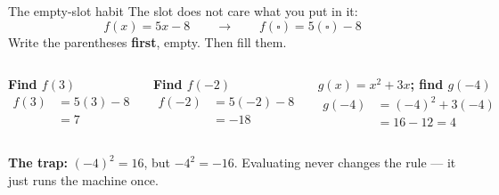 \documentclass[aspectratio=169, 11pt]{beamer}
\begin{document}
\begin{frame}[t, plain]

  \begin{block}{The empty-slot habit}
    The slot does not care what you put in it:
    \[ f(x) = 5x - 8 \qquad\longrightarrow\qquad f(\square) = 5(\square) - 8 \]
    Write the parentheses \textbf{first}, empty. Then fill them.
  \end{block}

  \bigskip
  \begin{columns}[T]
      \textbf{Find \(f(3)\)}
      \begin{align*}
        f(3) &= 5(3) - 8 \\
             &= 7
      \end{align*}

      \textbf{Find \(f(-2)\)}
      \begin{align*}
        f(-2) &= 5(-2) - 8 \\
              &= -18
      \end{align*}

      \textbf{\(g(x) = x^2 + 3x\); find \(g(-4)\)}
      \begin{align*}
        g(-4) &= (-4)^2 + 3(-4) \\
              &= 16 - 12 = 4
      \end{align*}
  \end{columns}

  \bigskip
  \textbf{The trap:} \((-4)^2 = 16\), but \(-4^2 = -16\). Evaluating never
  changes the rule --- it just runs the machine once.
\end{frame}
\end{document}
